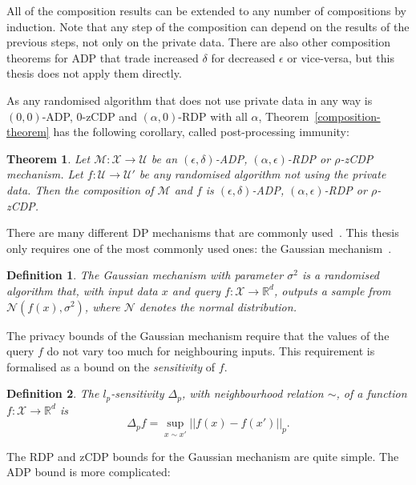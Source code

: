 \documentclass[english,twoside,openright]{HYgraduMLDS}
\newtheorem{theorem}{Theorem}
\newtheorem{definition}{Definition}
\newcommand{\R}{\mathbb{R}}
\newcommand{\calm}{{\mathcal{M}}}
\newcommand{\calx}{{\mathcal{X}}}
\newcommand{\calu}{{\mathcal{U}}}
\newcommand{\caln}{{\mathcal{N}}}
\begin{document}
All of the composition results can be extended to any number of compositions 
by induction. Note that any step of the composition can depend on the results 
of the previous steps, not only on the private data. There are also other composition
theorems for ADP that trade increased \(\delta\) for decreased \(\epsilon\)
or vice-versa, but this thesis does not apply them directly.

As any randomised algorithm that does not use private data in any way is
\((0, 0)\)-ADP, 0-zCDP and \((\alpha, 0)\)-RDP with all \(\alpha\), 
Theorem~\ref{composition-theorem} has the following corollary, called 
post-processing immunity:

\begin{theorem}
  Let \(\calm\colon \calx\to \calu\) be an \((\epsilon, \delta)\)-ADP,
  \((\alpha, \epsilon)\)-RDP or \(\rho\)-zCDP mechanism.
  Let \(f\colon \calu\to \calu'\) be any randomised algorithm
  not using the private data. Then the composition of \(\calm\) and \(f\)
  is \((\epsilon, \delta)\)-ADP, \((\alpha, \epsilon)\)-RDP or \(\rho\)-zCDP.
\end{theorem}

There are many different DP mechanisms that are commonly used~\cite{DwR14}.
This thesis only requires one of the most commonly 
used ones: the Gaussian mechanism~\cite{DKM06}.
\begin{definition}
  The Gaussian mechanism with parameter \(\sigma^2\) is a randomised algorithm that,
  with input data \(x\) and query \(f\colon \calx\to \R^{d}\), outputs a sample from
  \(\caln(f(x), \sigma^2)\), where \(\caln\) denotes the normal distribution.
\end{definition}

The privacy bounds of the Gaussian mechanism require that the values of the
query \(f\) do not vary too much for neighbouring inputs. This requirement
is formalised as a bound on the \emph{sensitivity} of \(f\).
\begin{definition}
    The \(l_p\)-sensitivity \(\Delta_p\), with neighbourhood relation \(\sim\),
    of a function \(f\colon \calx \to \R^d\)
    is
    \[
        \Delta_p f = \sup_{x\sim x'}||f(x) - f(x')||_p.
    \]
\end{definition}

The RDP and zCDP bounds for the Gaussian 
mechanism are quite simple. The ADP bound is more complicated:
\end{document}

